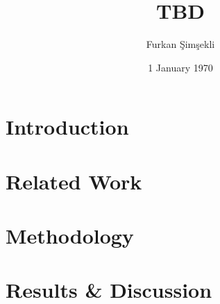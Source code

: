 \documentclass{article}
\begin{document}
\title{TBD}
\author{Furkan Şimşekli}
\date{1 January 1970}
\maketitle

\begin{abstract}
\lipsum[1]
\end{abstract}

\section{Introduction}

\lipsum[1]

\section{Related Work}

\lipsum[1]

\section{Methodology}

\lipsum[1]

\section{Results \& Discussion}

\lipsum[1]

\begin{thebibliography}{00}

\end{thebibliography}
\end{document}
